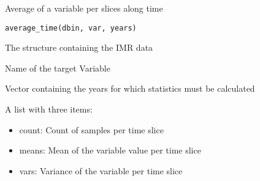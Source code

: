 %
\begin{Description}\relax
Average of a variable per slices along time
\end{Description}
%
\begin{Usage}
\begin{verbatim}
average_time(dbin, var, years)
\end{verbatim}
\end{Usage}
%
\begin{Arguments}
\begin{ldescription}
\item[\code{dbin}] 
The  structure containing the IMR data

\item[\code{var}] 
Name of the target Variable

\item[\code{years}] 
Vector containing the years for which statistics must be calculated

\end{ldescription}
\end{Arguments}
%
\begin{Value}
A list with three items:
\begin{itemize}

\item count: Count of samples per time slice
\item means: Mean of the variable value per time slice
\item vars:  Variance of the variable per time slice

\end{itemize}

\end{Value}
